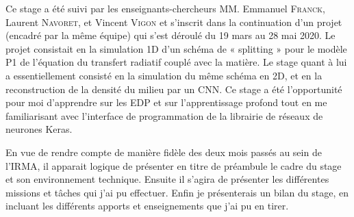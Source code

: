 Ce stage a été suivi par les enseignants-chercheurs MM. Emmanuel \textsc{Franck}, Laurent \textsc{Navoret}, et Vincent \textsc{Vigon} et s'inscrit dans la continuation d'un projet (encadré par la même équipe) qui s'est déroulé du 19 mars au 28 mai 2020. Le projet consistait en la simulation 1D d'un schéma de « splitting » pour le modèle P1 de l'équation du transfert radiatif couplé avec la matière. Le stage quant à lui a essentiellement consisté en la simulation du même schéma en 2D, et en la reconstruction de la densité du milieu par un CNN. Ce stage a été l'opportunité pour moi d'apprendre sur les EDP et sur l'apprentissage profond tout en me familiarisant avec l'interface de programmation de la librairie de réseaux de neurones Keras. 

En vue de rendre compte de manière fidèle des deux mois passés au sein de l'IRMA, il apparait logique de présenter en titre de préambule le cadre du stage et son environnement technique. Ensuite il s'agira de présenter les différentes missions et tâches qui j'ai pu effectuer. Enfin je présenterais un bilan du stage, en incluant les différents apports et enseignements que j'ai pu en tirer.
